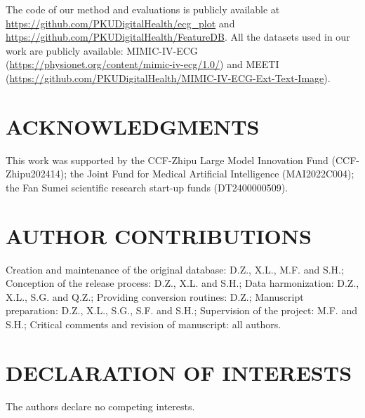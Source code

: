 \documentclass[12pt,letterpaper]{article}
\begin{document}
The code of our method and evaluations is publicly available at \url{https://github.com/PKUDigitalHealth/ecg_plot} and \url{https://github.com/PKUDigitalHealth/FeatureDB}. All the datasets used in our work are publicly available: MIMIC-IV-ECG (\url{https://physionet.org/content/mimic-iv-ecg/1.0/}) and MEETI (\url{https://github.com/PKUDigitalHealth/MIMIC-IV-ECG-Ext-Text-Image}).


\section*{ACKNOWLEDGMENTS}

This work was supported by the CCF-Zhipu Large Model Innovation Fund (CCF-Zhipu202414); the Joint Fund for Medical Artificial Intelligence (MAI2022C004); the Fan Sumei scientific research start-up funds (DT2400000509).

\section*{AUTHOR CONTRIBUTIONS}


Creation and maintenance of the original database: D.Z., X.L., M.F. and S.H.; Conception of the release process: D.Z., X.L. and S.H.; Data harmonization: D.Z., X.L., S.G. and Q.Z.; Providing conversion routines: D.Z.; Manuscript preparation: D.Z., X.L., S.G., S.F. and S.H.; Supervision of the project: M.F. and S.H.; Critical comments and revision of manuscript: all authors.


\section*{DECLARATION OF INTERESTS}


The authors declare no competing interests.


\newpage







\bigskip


\newpage
\end{document}

